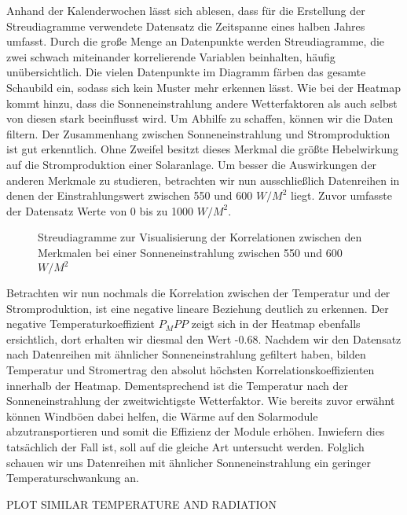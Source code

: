 \documentclass[12pt, a4paper]{article}
\begin{document}
Anhand der Kalenderwochen lässt sich ablesen, dass für die Erstellung der Streudiagramme verwendete Datensatz die Zeitspanne eines halben Jahres umfasst. Durch die große Menge an Datenpunkte werden Streudiagramme, die zwei schwach miteinander korrelierende Variablen beinhalten, häufig unübersichtlich. Die vielen Datenpunkte im Diagramm färben das gesamte Schaubild ein, sodass sich kein Muster mehr erkennen lässt. Wie bei der Heatmap kommt hinzu, dass die Sonneneinstrahlung andere Wetterfaktoren als auch selbst von diesen stark beeinflusst wird. Um Abhilfe zu schaffen, können wir die Daten filtern. Der Zusammenhang zwischen Sonneneinstrahlung und Stromproduktion ist gut erkenntlich. Ohne Zweifel besitzt dieses Merkmal die größte Hebelwirkung auf die Stromproduktion einer Solaranlage. Um besser die Auswirkungen der anderen Merkmale zu studieren, betrachten wir nun ausschließlich Datenreihen in denen der Einstrahlungswert zwischen 550 und 600 $W/ M^2$ liegt. Zuvor umfasste der Datensatz Werte von 0 bis zu 1000 $W/ M^2$.

\begin{figure}
\centering
\def\svgwidth{450pt}

\caption{Streudiagramme zur Visualisierung der Korrelationen zwischen den Merkmalen bei einer Sonneneinstrahlung zwischen 550 und 600 $W/ M^2$}
\label{fig:pairplot_filtered}
\end {figure}

Betrachten wir nun nochmals die Korrelation zwischen der Temperatur und der Stromproduktion, ist eine negative lineare Beziehung deutlich zu erkennen. Der negative Temperaturkoeffizient $P_MPP$ zeigt sich in der Heatmap ebenfalls ersichtlich, dort erhalten wir diesmal den Wert -0.68. Nachdem wir den Datensatz nach Datenreihen mit ähnlicher Sonneneinstrahlung gefiltert haben, bilden Temperatur und Stromertrag den absolut höchsten Korrelationskoeffizienten innerhalb der Heatmap. Dementsprechend ist die Temperatur nach der Sonneneinstrahlung der zweitwichtigste Wetterfaktor. Wie bereits zuvor erwähnt können Windböen dabei helfen, die Wärme auf den Solarmodule abzutransportieren und somit die Effizienz der Module erhöhen. Inwiefern dies tatsächlich der Fall ist, soll auf die gleiche Art untersucht werden. Folglich schauen wir uns Datenreihen mit ähnlicher Sonneneinstrahlung ein geringer Temperaturschwankung an.

PLOT SIMILAR TEMPERATURE AND RADIATION

 

\newpage
\end{document}
